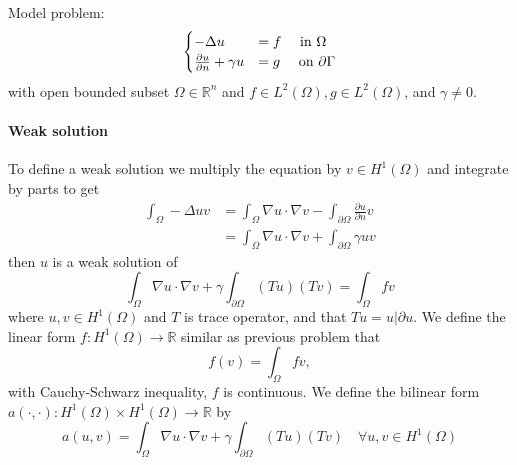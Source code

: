 \documentclass[11pt,letterpaper]{article}
\begin{document}
Model problem:
\begin{equation}
  \label{eq:neumann}
  \begin{cases}
    -\Delta u&= f\quad \textmd{ in }\Omega\\
    \frac{\partial u}{\partial n}+ \gamma u&=g \quad \textmd{ on }\partial \Gamma
  \end{cases}
\end{equation}
with open bounded subset $\Omega\in \mathbb{R}^n$ and $f\in L^2(\Omega), g\in L^2(\Omega)$, and $\gamma\neq 0$.


\paragraph{Weak solution}

To define a weak solution we multiply the equation by $v\in H^1(\Omega)$ and integrate by parts to get
\begin{displaymath}
  \begin{aligned}
    \int_\Omega -\Delta uv&= \int_\Omega \nabla u\cdot \nabla v-\int_{\partial \Omega}\frac{\partial u}{\partial n}v\\
    &= \int_\Omega \nabla u\cdot \nabla v+\int_{\partial \Omega}\gamma uv
  \end{aligned}
\end{displaymath}
then $u$ is a weak solution of
\begin{displaymath}
  \int_\Omega \nabla u\cdot \nabla v+\gamma\int_{\partial \Omega} (Tu)(Tv)=\int_\Omega fv
\end{displaymath}
where $u,v\in H^1(\Omega)$ and $T$ is trace operator, and that $Tu=u|{\partial u}$.
We define the linear form $f:H^1(\Omega)\rightarrow \mathbb{R}$ similar as previous problem that
\begin{displaymath}
  f(v)=\int_\Omega fv,
\end{displaymath}
with Cauchy-Schwarz inequality, $f$ is continuous.
We define the bilinear form $a(\cdot, \cdot):H^1(\Omega)\times H^1(\Omega)\rightarrow \mathbb{R}$ by
\begin{displaymath}
  a(u,v)= \int_\Omega \nabla u\cdot \nabla v+\gamma\int_{\partial \Omega} (Tu)(Tv)\quad \forall u,v\in H^1(\Omega)
\end{displaymath}
\end{document}
